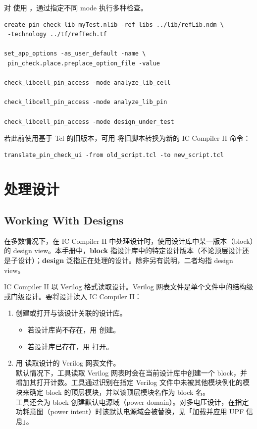 对  使用 ，通过指定不同 mode 执行多种检查。
\begin{lstlisting}
create_pin_check_lib myTest.nlib -ref_libs ../lib/refLib.ndm \
 -technology ../tf/refTech.tf

set_app_options -as_user_default -name \
 pin_check.place.preplace_option_file -value

check_libcell_pin_access -mode analyze_lib_cell

check_libcell_pin_access -mode analyze_lib_pin

check_libcell_pin_access -mode design_under_test
\end{lstlisting}

若此前使用基于 Tcl 的旧版本，可用  将旧脚本转换为新的 IC Compiler II 命令：
\begin{lstlisting}
translate_pin_check_ui -from old_script.tcl -to new_script.tcl
\end{lstlisting}

\section{处理设计}
\subsection*{Working With Designs}

在多数情况下，在 IC Compiler II 中处理设计时，使用设计库中某一版本（block）的 design view。本手册中，\textbf{block} 指设计库中的特定设计版本（不论顶层设计还是子设计）；\textbf{design} 泛指正在处理的设计。除非另有说明，二者均指 design view。

IC Compiler II 以 Verilog 格式读取设计。Verilog 网表文件是单个文件中的结构级或门级设计。要将设计读入 IC Compiler II：
\begin{enumerate}
  \item 创建或打开与该设计关联的设计库。
    \begin{itemize}
      \item 若设计库尚不存在，用  创建。
      \item 若设计库已存在，用  打开。
    \end{itemize}
  \item 用  读取设计的 Verilog 网表文件。\\
    默认情况下，工具读取 Verilog 网表时会在当前设计库中创建一个 block，并增加其打开计数。工具通过识别在指定 Verilog 文件中未被其他模块例化的模块来确定 block 的顶层模块，并以该顶层模块名作为 block 名。\\
    工具还会为 block 创建默认电源域（power domain）。对多电压设计，在指定功耗意图（power intent）时该默认电源域会被替换，见「加载并应用 UPF 信息」。
\end{enumerate}

